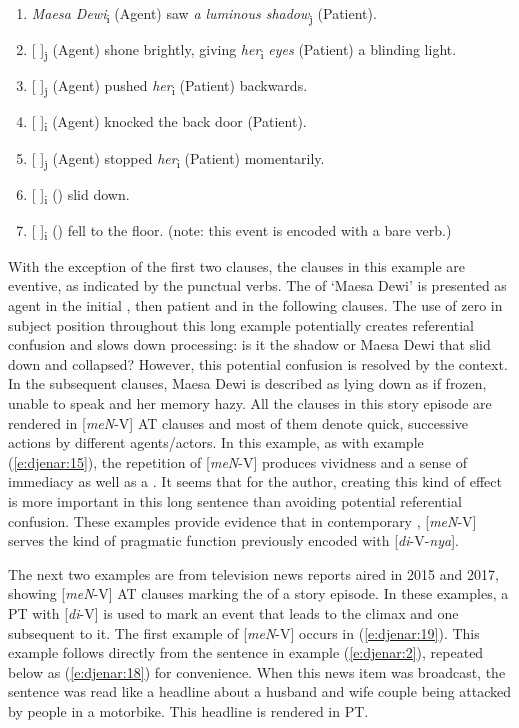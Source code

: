 \documentclass[output=paper
,modfonts
,nonflat]{langsci/langscibook}
\begin{document}
\begin{enumerate}
	\item \textit{Maesa Dewi}\textsubscript{i} (Agent) saw \textit{a luminous shadow}\textsubscript{j} (Patient).
	\item {[ ]}\textsubscript{j} (Agent) shone brightly, giving \textit{her}\textsubscript{i} \textit{eyes} (Patient) a blinding light. 
	\item {[ ]}\textsubscript{j} (Agent) pushed \textit{her}\textsubscript{i} (Patient) backwards.
	\item {[ ]}\textsubscript{i} (Agent) knocked the back door (Patient).
	\item {[ ]}\textsubscript{j} (Agent) stopped \textit{her}\textsubscript{i} (Patient) momentarily.
	\item {[ ]}\textsubscript{i} () slid down.
	\item {[ ]}\textsubscript{i} () fell to the floor. (note: this event is encoded with a bare verb.)
\end{enumerate}

\noindent
With the exception of the first two clauses, the clauses in this example are eventive, as indicated by the punctual verbs. The  of ‘Maesa Dewi’ is presented as agent in the initial , then patient and  in the following clauses. The use of zero in subject position throughout this long example potentially creates referential confusion and slows down processing: is it the shadow or Maesa Dewi that slid down and collapsed? However, this potential confusion is resolved by the  context. In the subsequent clauses, Maesa Dewi is described as lying down as if frozen, unable to speak and her memory hazy. All the clauses in this story episode are rendered in [\textit{meN}-V] AT clauses and most of them denote quick, successive actions by different agents/actors. In this example, as with example (\ref{e:djenar:15}), the repetition of [\textit{meN}-V] produces vividness and a sense of immediacy as well as a . It seems that for the author, creating this kind of effect is more important in this long sentence than avoiding potential referential confusion. These examples provide evidence that in contemporary , [\textit{meN}-V] serves the kind of pragmatic function previously encoded with [\textit{di}-V-\textit{nya}]. 

The next two examples are from television news reports aired in 2015 and 2017, showing [\textit{meN}-V] AT clauses marking the  of a story episode. In these examples, a PT  with [\textit{di}-V] is used to mark an event that leads to the climax and one subsequent to it. The first example of [\textit{meN}-V] occurs in (\ref{e:djenar:19}). This example follows directly from the sentence in example (\ref{e:djenar:2}), repeated below as (\ref{e:djenar:18}) for convenience. When this news item was broadcast, the sentence was read like a headline about a husband and wife couple being attacked by people in a motorbike. This headline is rendered in PT.
\end{document}
